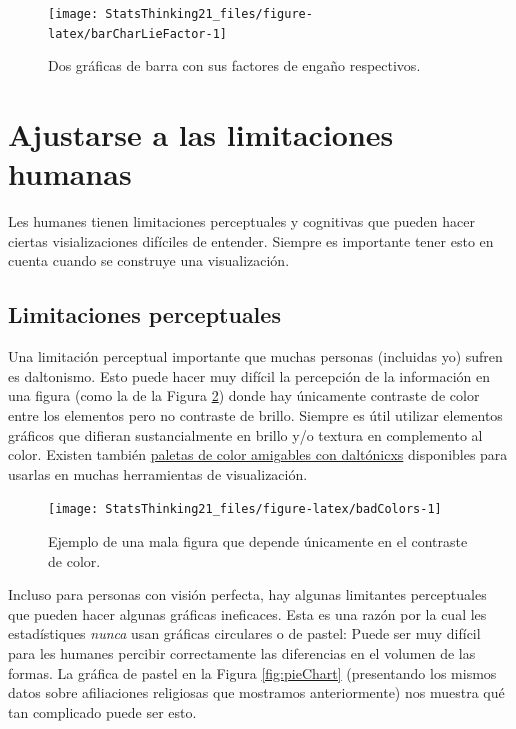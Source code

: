 \documentclass[
  12pt,
]{book}
\begin{document}
\begin{figure}
\texttt{[image: StatsThinking21\_files/figure-latex/barCharLieFactor-1]} \caption{Dos gráficas de barra con sus factores de engaño  respectivos.}\label{fig:barCharLieFactor}
\end{figure}

\hypertarget{ajustarse-a-las-limitaciones-humanas}{%
\section{Ajustarse a las limitaciones humanas}\label{ajustarse-a-las-limitaciones-humanas}}

Les humanes tienen limitaciones perceptuales y cognitivas que pueden hacer ciertas visializaciones difíciles de entender. Siempre es importante tener esto en cuenta cuando se construye una visualización.

\hypertarget{limitaciones-perceptuales}{%
\subsection{Limitaciones perceptuales}\label{limitaciones-perceptuales}}

Una limitación perceptual importante que muchas personas (incluidas yo) sufren es daltonismo. Esto puede hacer muy difícil la percepción de la información en una figura (como la de la Figura \ref{fig:badColors}) donde hay únicamente contraste de color entre los elementos pero no contraste de brillo. Siempre es útil utilizar elementos gráficos que difieran sustancialmente en brillo y/o textura en complemento al color. Existen también \href{http://www.cookbook-r.com/Graphs/Colors_(ggplot2)/\#a-colorblind-friendly-palette}{paletas de color amigables con daltónicxs} disponibles para usarlas en muchas herramientas de visualización.

\begin{figure}
\texttt{[image: StatsThinking21\_files/figure-latex/badColors-1]} \caption{Ejemplo de una mala figura que depende únicamente en el contraste de color.}\label{fig:badColors}
\end{figure}

Incluso para personas con visión perfecta, hay algunas limitantes perceptuales que pueden hacer algunas gráficas ineficaces. Esta es una razón por la cual les estadístiques \emph{nunca} usan gráficas circulares o de pastel: Puede ser muy difícil para les humanes percibir correctamente las diferencias en el volumen de las formas. La gráfica de pastel en la Figura \ref{fig:pieChart} (presentando los mismos datos sobre afiliaciones religiosas que mostramos anteriormente) nos muestra qué tan complicado puede ser esto.
\end{document}
